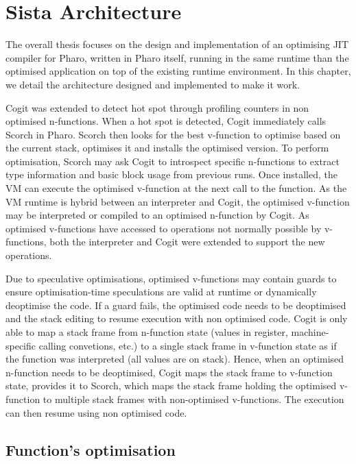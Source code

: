 \documentclass[a4paper,12pt,twoside]{../includes/ThesisStyle}
\begin{document}
\fi

\chapter{Sista Architecture}
\label{chap:architecture}
\minitoc

The overall thesis focuses on the design and implementation of an optimising JIT compiler for Pharo, written in Pharo itself, running in the same runtime than the optimised application on top of the existing runtime environment. In this chapter, we detail the architecture designed and implemented to make it work.

Cogit was extended to detect hot spot through profiling counters in non optimised n-functions. When a hot spot is detected, Cogit immediately calls Scorch in Pharo. Scorch then looks for the best v-function to optimise based on the current stack, optimises it and installs the optimised version. To perform optimisation, Scorch may ask Cogit to introspect specific n-functions to extract type information and basic block usage from previous runs. Once installed, the VM can execute the optimised v-function at the next call to the function. As the VM runtime is hybrid between an interpreter and Cogit, the optimised v-function may be interpreted or compiled to an optimised n-function by Cogit. As optimised v-functions have accessed to operations not normally possible by v-functions, both the interpreter and Cogit were extended to support the new operations.

Due to speculative optimisations, optimised v-functions may contain guards to ensure optimisation-time speculations are valid at runtime or dynamically deoptimise the code. If a guard fails, the optimised code needs to be deoptimised and the stack editing to resume execution with non optimised code. Cogit is only able to map a stack frame from n-function state (values in register, machine-specific calling convetions, etc.) to a single stack frame in v-function state as if the function was interpreted (all values are on stack). Hence, when an optimised n-function needs to be deoptimised, Cogit maps the stack frame to v-function state, provides it to Scorch, which maps the stack frame holding the optimised v-function to multiple stack frames with non-optimised v-functions. The execution can then resume using non optimised code.

\section {Function's optimisation}
\end{document}
